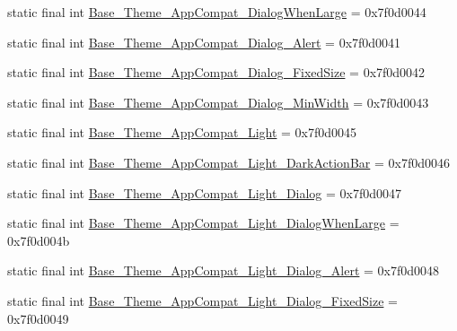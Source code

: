 \begin{DoxyCompactItemize}
\item 
static final int \mbox{\hyperlink{classandroid_1_1support_1_1v7_1_1appcompat_1_1_r_1_1style_ab3c5904aaf094fea489a96fd27d27f5c}{Base\+\_\+\+Theme\+\_\+\+App\+Compat\+\_\+\+Dialog\+When\+Large}} = 0x7f0d0044
\item 
static final int \mbox{\hyperlink{classandroid_1_1support_1_1v7_1_1appcompat_1_1_r_1_1style_ada2c22dc6fb4c92d077cd4a02d43b80f}{Base\+\_\+\+Theme\+\_\+\+App\+Compat\+\_\+\+Dialog\+\_\+\+Alert}} = 0x7f0d0041
\item 
static final int \mbox{\hyperlink{classandroid_1_1support_1_1v7_1_1appcompat_1_1_r_1_1style_a3072b639ca4d5edf5804977ebeb2d49e}{Base\+\_\+\+Theme\+\_\+\+App\+Compat\+\_\+\+Dialog\+\_\+\+Fixed\+Size}} = 0x7f0d0042
\item 
static final int \mbox{\hyperlink{classandroid_1_1support_1_1v7_1_1appcompat_1_1_r_1_1style_a6c7bf430cec7ead4856c4bd105b372f7}{Base\+\_\+\+Theme\+\_\+\+App\+Compat\+\_\+\+Dialog\+\_\+\+Min\+Width}} = 0x7f0d0043
\item 
static final int \mbox{\hyperlink{classandroid_1_1support_1_1v7_1_1appcompat_1_1_r_1_1style_a21221b90b140d668d6828375f531bd0e}{Base\+\_\+\+Theme\+\_\+\+App\+Compat\+\_\+\+Light}} = 0x7f0d0045
\item 
static final int \mbox{\hyperlink{classandroid_1_1support_1_1v7_1_1appcompat_1_1_r_1_1style_a8a1bcb0c15999d6dc1bb8982c227409f}{Base\+\_\+\+Theme\+\_\+\+App\+Compat\+\_\+\+Light\+\_\+\+Dark\+Action\+Bar}} = 0x7f0d0046
\item 
static final int \mbox{\hyperlink{classandroid_1_1support_1_1v7_1_1appcompat_1_1_r_1_1style_afdae1fc80f953e632283e11338b1d9ef}{Base\+\_\+\+Theme\+\_\+\+App\+Compat\+\_\+\+Light\+\_\+\+Dialog}} = 0x7f0d0047
\item 
static final int \mbox{\hyperlink{classandroid_1_1support_1_1v7_1_1appcompat_1_1_r_1_1style_aac096fa4a63eb07be4009ae6325785ac}{Base\+\_\+\+Theme\+\_\+\+App\+Compat\+\_\+\+Light\+\_\+\+Dialog\+When\+Large}} = 0x7f0d004b
\item 
static final int \mbox{\hyperlink{classandroid_1_1support_1_1v7_1_1appcompat_1_1_r_1_1style_acde9422ae8c11ea0144daceddb2885f8}{Base\+\_\+\+Theme\+\_\+\+App\+Compat\+\_\+\+Light\+\_\+\+Dialog\+\_\+\+Alert}} = 0x7f0d0048
\item 
static final int \mbox{\hyperlink{classandroid_1_1support_1_1v7_1_1appcompat_1_1_r_1_1style_a5f39b1dc9c0baf075c95d9ad78ebcb5f}{Base\+\_\+\+Theme\+\_\+\+App\+Compat\+\_\+\+Light\+\_\+\+Dialog\+\_\+\+Fixed\+Size}} = 0x7f0d0049
\item 

\end{DoxyCompactItemize}
